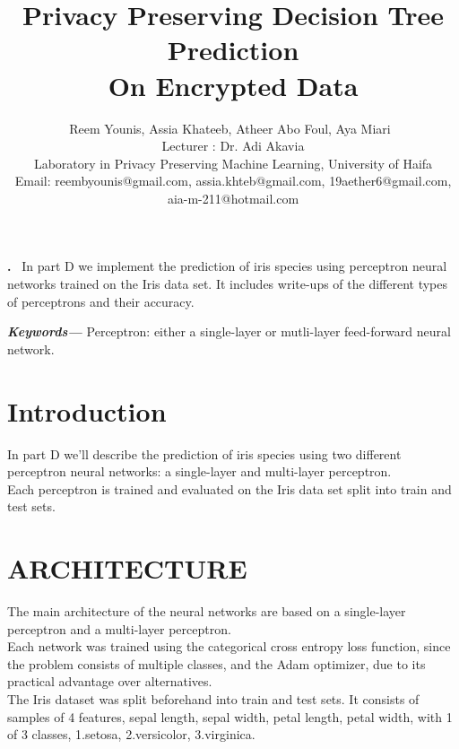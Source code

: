 \documentclass[12pt]{article}
\renewenvironment{abstract}
 {\par\noindent\textbf{\abstractname.}\ \ignorespaces}
 {\par\medskip}
\providecommand{\keywords}[1]
{
  \small	
  \textbf{\textit{Keywords---}} #1
}
\begin{document}
\title{Privacy Preserving Decision Tree Prediction \\ On Encrypted Data}


\author{Reem Younis, Assia Khateeb, Atheer Abo Foul, Aya Miari\
\\
Lecturer : Dr. Adi Akavia
\\Laboratory in Privacy Preserving Machine Learning, 
University of Haifa\\
\small{Email: reembyounis@gmail.com, assia.khteb@gmail.com, 19aether6@gmail.com, aia-m-211@hotmail.com}

}
\maketitle
\tableofcontents

\newpage

\begin{abstract}
In part D we implement the prediction of iris species using perceptron neural networks trained on the Iris data set. It includes write-ups of the different types of perceptrons and their accuracy.

\end{abstract}

\keywords{Perceptron: either a single-layer or mutli-layer feed-forward neural network.}



\section{Introduction}
In part D we'll  describe the                 
prediction of iris species using two different   perceptron neural networks: a single-layer and multi-layer perceptron.\\ Each perceptron is trained and evaluated on the Iris data set split into train and test sets. 

\section{\small{ARCHITECTURE}}
The main architecture of the neural networks are based on a single-layer perceptron and a multi-layer perceptron.\\
Each network was trained using the             
categorical cross entropy loss function, since the problem consists of multiple classes, and the Adam optimizer, due to its practical advantage over alternatives. \\
The Iris dataset was split beforehand into train and test sets. It consists of samples of 4 features, sepal length, sepal width, petal length, petal width, with 1 of 3 classes, 1.setosa,               
2.versicolor,
3.virginica.
\end{document}
